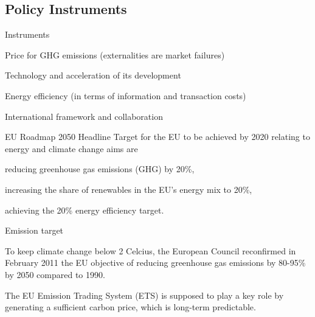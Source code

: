 


\subsection{Policy Instruments}

{Instruments}






	Price for GHG emissions (externalities are market failures)

	Technology and acceleration of its development

	Energy efficiency (in terms of information and transaction costs)

	International framework and collaboration






{EU Roadmap 2050}
Headline Target for the EU to be achieved by 2020 relating to energy and climate change aims are






	reducing greenhouse gas emissions (GHG) by 20\%,

	increasing the share of renewables in the EU's energy mix to 20\%,

	achieving the 20\% energy efficiency target.






{Emission target}






	To keep climate change below 2 Celcius, the European Council reconfirmed in February
2011 the EU objective of reducing greenhouse gas emissions by 80-95\% by 2050 compared to
1990.

	The EU Emission Trading System (ETS) is supposed to play a key role by generating a sufficient carbon price,
which is long-term predictable.

